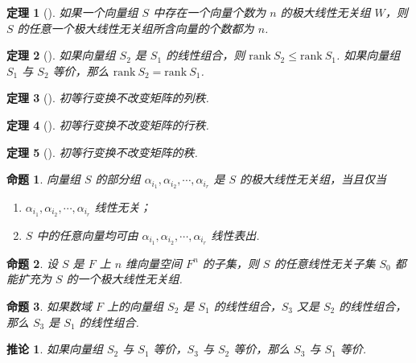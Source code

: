 \documentclass[zihao=-4,UTF8,linespread=1.8,nothm]{aytony_base}
\newtheorem{theorem}{\indent 定理}[subsection]
\newtheorem{proposition}{\indent 命题}[subsection]
\newtheorem*{corollary}{\indent 推论}
\begin{document}
\begin{theorem}[]
    如果一个向量组 $S$ 中存在一个向量个数为 $n$ 的极大线性无关组 $W$，则 $S$ 的任意一个极大线性无关组所含向量的个数都为 $n$.
\end{theorem}

\begin{theorem}[]
    如果向量组 $S_2$ 是 $S_1$ 的线性组合，则 $\mathrm{rank}\ S_2 \leqslant \mathrm{rank}\ S_1$. 如果向量组 $S_1$ 与 $S_2$ 等价，那么 $\mathrm{rank}\ S_2 = \mathrm{rank}\ S_1$.
\end{theorem}

\begin{theorem}[]
    初等行变换不改变矩阵的列秩.
\end{theorem}

\begin{theorem}[]
    初等行变换不改变矩阵的行秩.
\end{theorem}

\begin{theorem}[]
    初等行变换不改变矩阵的秩.
\end{theorem}

\begin{proposition}
    向量组 $S$ 的部分组 $\alpha_{i_1}, \alpha_{i_2}, \cdots, \alpha_{i_r}$ 是 $S$ 的极大线性无关组，当且仅当
    \begin{enumerate}[nosep]
        \item $\alpha_{i_1}, \alpha_{i_2}, \cdots, \alpha_{i_r}$ 线性无关；
        \item $S$ 中的任意向量均可由 $\alpha_{i_1}, \alpha_{i_2}, \cdots, \alpha_{i_r}$ 线性表出.
    \end{enumerate}
\end{proposition}

\begin{proposition}
    设 $S$ 是 $F$ 上 $n$ 维向量空间 $F^n$ 的子集，则 $S$ 的任意线性无关子集 $S_0$ 都能扩充为 $S$ 的一个极大线性无关组.
\end{proposition}

\begin{proposition}
    如果数域 $F$ 上的向量组 $S_2$ 是 $S_1$ 的线性组合，$S_3$ 又是 $S_2$ 的线性组合，那么 $S_3$ 是 $S_1$ 的线性组合.
\end{proposition}

\begin{corollary}
    如果向量组 $S_2$ 与 $S_1$ 等价，$S_3$ 与 $S_2$ 等价，那么 $S_3$ 与 $S_1$ 等价.
\end{corollary}
\end{document}

